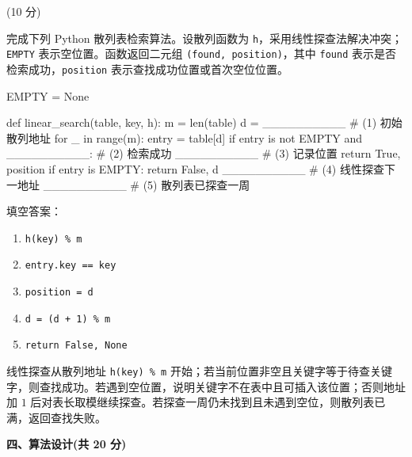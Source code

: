 \begin{question}[散列表检索](10 分)

完成下列 Python 散列表检索算法。设散列函数为 \texttt{h}，采用线性探查法解决冲突；\texttt{EMPTY} 表示空位置。函数返回二元组 \texttt{(found, position)}，其中 \texttt{found} 表示是否检索成功，\texttt{position} 表示查找成功位置或首次空位位置。

\begin{pycode}
EMPTY = None


def linear_search(table, key, h):
    m = len(table)
    d = __________                              # (1) 初始散列地址
    for _ in range(m):
        entry = table[d]
        if entry is not EMPTY and __________:   # (2) 检索成功
            __________                          # (3) 记录位置
            return True, position
        if entry is EMPTY:
            return False, d
        __________                              # (4) 线性探查下一地址
    __________                                  # (5) 散列表已探查一周
\end{pycode}

\begin{solution}
填空答案：
\begin{enumerate}
  \item \texttt{h(key) \% m}
  \item \texttt{entry.key == key}
  \item \texttt{position = d}
  \item \texttt{d = (d + 1) \% m}
  \item \texttt{return False, None}
\end{enumerate}
线性探查从散列地址 \texttt{h(key) \% m} 开始；若当前位置非空且关键字等于待查关键字，则查找成功。若遇到空位置，说明关键字不在表中且可插入该位置；否则地址加 $1$ 后对表长取模继续探查。若探查一周仍未找到且未遇到空位，则散列表已满，返回查找失败。
\end{solution}
\end{question}
\clearpage

\textbf{四、算法设计(共 20 分)}



